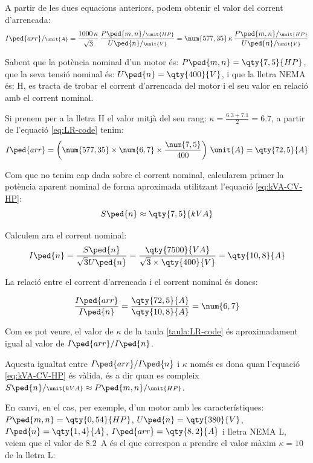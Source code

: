 A partir de les dues equacions anteriors, podem obtenir el valor del corrent d'arrencada:
\begin{equation}
    I\ped{arr}/{\scriptstyle \unit{A}} = \frac{1000 \,\kappa}{\sqrt{3}} \,\frac{P\ped{m,n}/{\scriptstyle \unit{HP}}}{U\ped{n}/{\scriptstyle \unit{V}}} = \num{577,35}\,\kappa\,\frac{P\ped{m,n}/{\scriptstyle \unit{HP}}}{U\ped{n}/{\scriptstyle \unit{V}}}\label{eq:LR-code}
\end{equation}


	
\begin{exemple}[\MotorArrencNEMA{}]
	\addcontentsxms{\MotorArrencNEMA}
    Sabent que la  potència nominal d'un motor és: $P\ped{m,n} = \qty{7,5}{HP}$,    que la seva tensió nominal és: $U\ped{n}=\qty{400}{V}$, i que la lletra NEMA és: H, es tracta de trobar el corrent d'arrencada  del  motor i el seu valor en relació amb el corrent nominal.

    Si prenem per a la lletra H el valor mitjà del seu rang: $\kappa = \frac{\num{6,3}+\num{7,1}}{2}=\num{6,7}$, a partir de l'equació  \eqref{eq:LR-code} tenim:
    \[
      I\ped{arr} = \left(\num{577,35} \times \num{6,7} \times \frac{\num{7,5}}{400}\right) \,\unit{A} = \qty{72,5}{A}
    \]

    Com que no tenim cap dada sobre el corrent nominal, calcularem primer la potència aparent nominal de forma aproximada utilitzant l'equació \eqref{eq:kVA-CV-HP}:
    \[
        S\ped{n} \approx \qty{7,5}{kVA}
    \]

    Calculem ara el corrent nominal:
    \[
        I\ped{n}= \frac{S\ped{n}}{\sqrt{3} U\ped{n}} = \frac{\qty{7500}{VA}}{\sqrt{3}\times\qty{400}{V}} = \qty{10,8}{A}
    \]

    La relació entre el corrent d'arrencada i el corrent nominal és doncs:
    
    \[
        \frac{I\ped{arr}}{I\ped{n}} = \frac{\qty{72,5}{A}}{\qty{10,8}{A}} = \num{6,7}
    \]

    Com es pot veure, el valor  de $\kappa$ de la taula \vref{taula:LR-code} és aproximadament igual al valor de $I\ped{arr}/I\ped{n}$.

    Aquesta igualtat entre $I\ped{arr}/I\ped{n}$ i $\kappa$ només es dona quan l'equació \eqref{eq:kVA-CV-HP} és vàlida, és a dir quan es compleix $S\ped{n}/{\scriptstyle \unit{kVA}} \approx  P\ped{m,n}/{\scriptstyle \unit{HP}}$.

    En canvi, en el cas, per exemple, d'un motor amb les característiques: $P\ped{m,n} = \qty{0,54}{HP}$, $U\ped{n} = \qty{380}{V}$, $I\ped{n} = \qty{1,4}{A}$, $I\ped{arr} = \qty{8,2}{A}$ i lletra NEMA L, veiem que el valor de \qty{8,2}{A} és el que correspon a prendre  el valor màxim $\kappa = 10$ de la lletra L:
    

\end{exemple}
